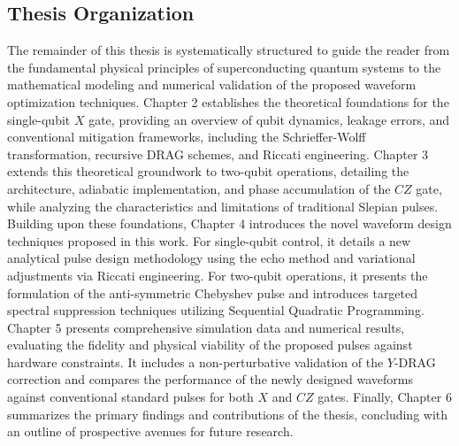 \subsection{Thesis Organization}
The remainder of this thesis is systematically structured to guide the reader from the fundamental physical principles
of superconducting quantum systems to the mathematical modeling and numerical validation of the proposed waveform
optimization techniques.  Chapter 2 establishes the theoretical foundations for the single-qubit $X$ gate, providing an
overview of qubit dynamics, leakage errors, and conventional mitigation frameworks, including the Schrieffer-Wolff
transformation, recursive DRAG schemes, and Riccati engineering. Chapter 3 extends this theoretical groundwork to
two-qubit operations, detailing the architecture, adiabatic implementation, and phase accumulation of the $CZ$ gate, while
analyzing the characteristics and limitations of traditional Slepian pulses.  Building upon these foundations, Chapter 4
introduces the novel waveform design techniques proposed in this work. For single-qubit control, it details a new
analytical pulse design methodology using the echo method and variational adjustments via Riccati engineering. For
two-qubit operations, it presents the formulation of the anti-symmetric Chebyshev pulse and introduces targeted spectral
suppression techniques utilizing Sequential Quadratic Programming.  Chapter 5 presents comprehensive simulation data and
numerical results, evaluating the fidelity and physical viability of the proposed pulses against hardware constraints.
It includes a non-perturbative validation of the $Y$-DRAG correction and compares the performance of the newly designed
waveforms against conventional standard pulses for both $X$ and $CZ$ gates. Finally, Chapter 6 summarizes the primary
findings and contributions of the thesis, concluding with an outline of prospective avenues for future research.
